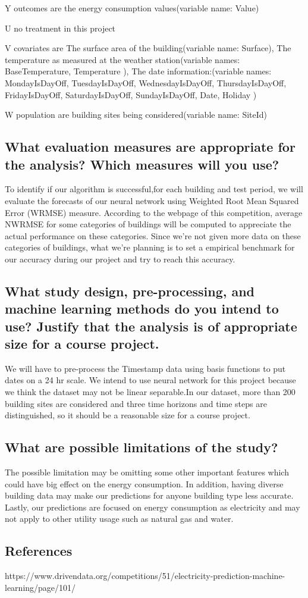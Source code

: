 \documentclass{article}
\begin{document}
\item Y outcomes are the energy consumption values(variable name: Value)
\item U no treatment in this project
\item V covariates are The surface area of the building(variable name: Surface), The temperature as measured at the weather station(variable names: BaseTemperature, Temperature ), The date information:(variable names: MondayIsDayOff, TuesdayIsDayOff, WednesdayIsDayOff,
ThursdayIsDayOff, FridayIsDayOff, SaturdayIsDayOff, SundayIsDayOff, Date, Holiday )
\item W population are building sites being considered(variable name: SiteId)


\subsection{What evaluation measures are appropriate for the analysis? Which measures will you use?}
To identify if our algorithm is successful,for each building and test period, we will evaluate the forecasts of our neural network using Weighted Root Mean Squared Error (WRMSE) measure. According to the webpage of this competition, average NWRMSE for some categories of buildings will be computed to appreciate the actual performance on these categories. Since we’re not given more data on these categories of buildings, what we’re planning is to set a empirical benchmark for our accuracy during our project and try to reach this accuracy.

\subsection{What study design, pre-processing, and machine learning methods do you intend to use? Justify that the analysis is of appropriate size for a course project.}
We will have to pre-process the Timestamp data using basis functions to put dates on a 24 hr scale. We intend to use neural network for this project because we think the dataset may not be linear separable.In our dataset, more than 200 building sites are considered and three time horizons and time steps are distinguished, so it should be a reasonable size for a course project.

\subsection{What are possible limitations of the study?}
The possible limitation may be omitting some other important features which could have big effect on the energy consumption. In addition, having diverse building data may make our predictions for anyone building type less accurate. Lastly, our predictions are focused on energy consumption as electricity and may not apply to other utility usage such as natural gas and water.

\subsection{References}
https://www.drivendata.org/competitions/51/electricity-prediction-machine-learning/page/101/
\end{document}
